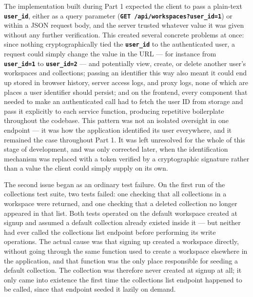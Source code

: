 The implementation built during Part 1 expected the client to pass a plain-text \textbf{\texttt{user\_id}}, either as a query parameter (\textbf{\texttt{GET /api/workspaces?user\_id=1}}) or within a JSON request body, and the server trusted whatever value it was given without any further verification. This created several concrete problems at once: since nothing cryptographically tied the \textbf{\texttt{user\_id}} to the authenticated user, a request could simply change the value in the URL --- for instance from \textbf{\texttt{user\_id=1}} to \textbf{\texttt{user\_id=2}} --- and potentially view, create, or delete another user's workspaces and collections; passing an identifier this way also meant it could end up stored in browser history, server access logs, and proxy logs, none of which are places a user identifier should persist; and on the frontend, every component that needed to make an authenticated call had to fetch the user ID from storage and pass it explicitly to each service function, producing repetitive boilerplate throughout the codebase. This pattern was not an isolated oversight in one endpoint --- it was how the application identified its user everywhere, and it remained the case throughout Part 1. It was left unresolved for the whole of this stage of development, and was only corrected later, when the identification mechanism was replaced with a token verified by a cryptographic signature rather than a value the client could simply supply on its own.

The second issue began as an ordinary test failure. On the first run of the collections test suite, two tests failed: one checking that all collections in a workspace were returned, and one checking that a deleted collection no longer appeared in that list. Both tests operated on the default workspace created at signup and assumed a default collection already existed inside it --- but neither had ever called the collections list endpoint before performing its write operations. The actual cause was that signing up created a workspace directly, without going through the same function used to create a workspace elsewhere in the application, and that function was the only place responsible for seeding a default collection. The collection was therefore never created at signup at all; it only came into existence the first time the collections list endpoint happened to be called, since that endpoint seeded it lazily on demand.

